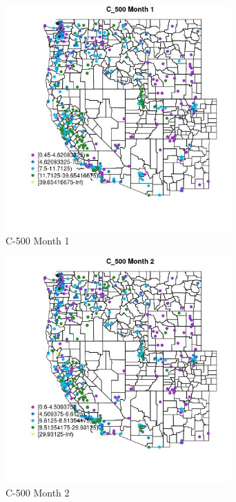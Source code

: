 \begin{figure} 
\centering  
\includegraphics[width=0.77\textwidth]{Code_Outputs/ML_input_report_ML_input_PM25_Step5_part_d_de_duplicated_aves_ML_input_MapObsMo1C_500.jpg} 
\caption{\label{fig:ML_input_report_ML_input_PM25_Step5_part_d_de_duplicated_aves_ML_inputMapObsMo1C_500}C-500 Month 1} 
\end{figure} 
 

\begin{figure} 
\centering  
\includegraphics[width=0.77\textwidth]{Code_Outputs/ML_input_report_ML_input_PM25_Step5_part_d_de_duplicated_aves_ML_input_MapObsMo2C_500.jpg} 
\caption{\label{fig:ML_input_report_ML_input_PM25_Step5_part_d_de_duplicated_aves_ML_inputMapObsMo2C_500}C-500 Month 2} 
\end{figure} 
 

